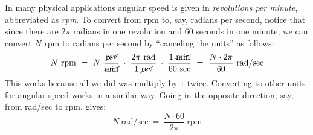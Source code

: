 In many physical applications angular speed is given in \emph{revolutions per minute}, abbreviated
as \emph{rpm}. To convert from rpm to, say, radians per second, notice that since there
are $2\pi$ radians in one revolution and $60$ seconds in one minute, we can convert $N$ rpm to
radians per second by ``canceling the units'' as follows:
\begin{displaymath}
 N~\text{rpm} ~=~ N~\frac{\cancel{\text{rev}}}{\cancel{\text{min}}} \;\cdot\;
  \frac{2\pi~\text{rad}}{1~\cancel{\text{rev}}}
  \;\cdot\; \frac{1~\cancel{\text{min}}}{60~\text{sec}} ~=~ \frac{N \cdot 2\pi}{60}~\text{rad/sec}
\end{displaymath}
This works because all we did was multiply by $1$ twice. Converting to other units for angular
speed works in a similar way. Going in the opposite direction, say, from rad/sec to rpm, gives:
\begin{displaymath}
 N~\text{rad/sec} ~=~ \frac{N \cdot 60}{2\pi}~\text{rpm}
\end{displaymath}
\newpage
